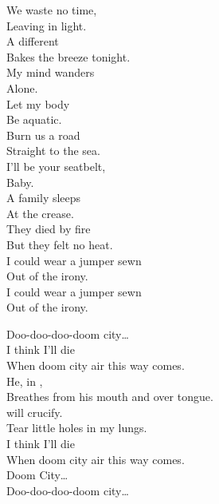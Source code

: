 We waste no time, \\
Leaving in light. \\
A different  \\
Bakes the breeze tonight. \\

My mind wanders \\
Alone. \\
Let my body \\
Be aquatic. \\

Burn us a road \\
Straight to the sea. \\
I'll be your seatbelt, \\
Baby. \\

A family sleeps \\
At the crease. \\
They died by fire \\
But they felt no heat. \\
I could wear a jumper sewn \\
Out of the irony. \\

I could wear a jumper sewn \\
Out of the irony. \\





Doo-doo-doo-doom city… \\

I think I'll die \\
When doom city air this way comes. \\
He, in , \\
Breathes from his mouth and over tongue. \\

 will crucify. \\
Tear little holes in my lungs. \\
I think I'll die \\
When doom city air this way comes. \\

Doom City… \\

Doo-doo-doo-doom city… \\

